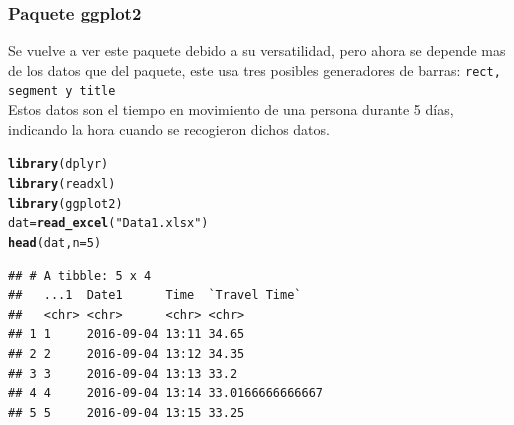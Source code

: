 \documentclass{article}\usepackage[]{graphicx}\usepackage[]{color}
\makeatletter
\newcommand{\hlnum}[1]{\textcolor[rgb]{0.686,0.059,0.569}{#1}}%
\newcommand{\hlstr}[1]{\textcolor[rgb]{0.192,0.494,0.8}{#1}}%
\newcommand{\hlstd}[1]{\textcolor[rgb]{0.345,0.345,0.345}{#1}}%
\newcommand{\hlkwb}[1]{\textcolor[rgb]{0.69,0.353,0.396}{#1}}%
\newcommand{\hlkwc}[1]{\textcolor[rgb]{0.333,0.667,0.333}{#1}}%
\newcommand{\hlkwd}[1]{\textcolor[rgb]{0.737,0.353,0.396}{\textbf{#1}}}%
\newenvironment{kframe}{%
 \def\at@end@of@kframe{}%
 \ifinner\ifhmode%
  \def\at@end@of@kframe{\end{minipage}}%
  \begin{minipage}{\columnwidth}%
 \fi\fi%
 \def\FrameCommand##1{\hskip\@totalleftmargin \hskip-\fboxsep
 \colorbox{shadecolor}{##1}\hskip-\fboxsep
     \hskip-\linewidth \hskip-\@totalleftmargin \hskip\columnwidth}%
 \MakeFramed {\advance\hsize-\width
   \@totalleftmargin\z@ \linewidth\hsize
   \@setminipage}}%
 {\par\unskip\endMakeFramed%
 \at@end@of@kframe}
\newenvironment{knitrout}{}{} %
\makeatother
\begin{document}
\subsubsection{Paquete ggplot2}
Se vuelve a ver este paquete\cite{docu_ggplot2} debido a su versatilidad, pero ahora se depende mas de los datos que del paquete, este usa tres posibles generadores de barras: \texttt{rect, segment y title}~\\
Estos datos son el tiempo en movimiento de una persona durante 5 d\'ias, indicando la hora cuando se recogieron dichos datos.
\begin{knitrout}
\color{fgcolor}\begin{kframe}
\begin{alltt}
\hlkwd{library}\hlstd{(dplyr)}
\hlkwd{library}\hlstd{(readxl)}
\hlkwd{library}\hlstd{(ggplot2)}
\hlstd{dat} \hlkwb{=} \hlkwd{read_excel}\hlstd{(}\hlstr{"Data1.xlsx"}\hlstd{)}
\hlkwd{head}\hlstd{(dat,} \hlkwc{n}\hlstd{=}\hlnum{5}\hlstd{)}
\end{alltt}
\begin{verbatim}
## # A tibble: 5 x 4
##   ...1  Date1      Time  `Travel Time`   
##   <chr> <chr>      <chr> <chr>           
## 1 1     2016-09-04 13:11 34.65           
## 2 2     2016-09-04 13:12 34.35           
## 3 3     2016-09-04 13:13 33.2            
## 4 4     2016-09-04 13:14 33.0166666666667
## 5 5     2016-09-04 13:15 33.25
\end{verbatim}
\end{kframe}
\end{knitrout}
\end{document}
